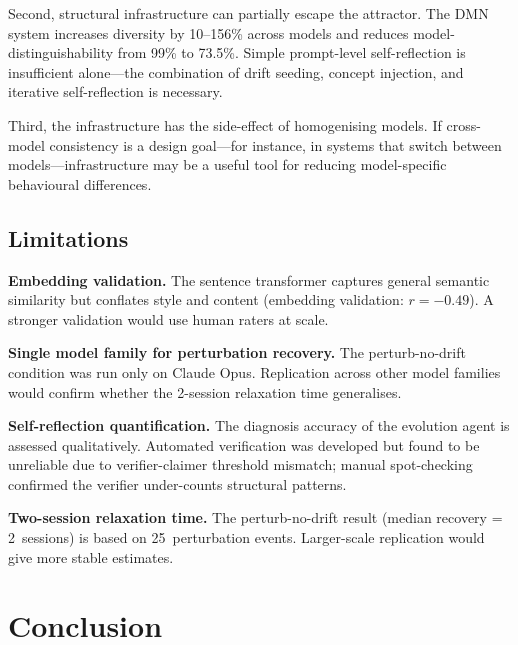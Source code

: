 \documentclass{article}
\begin{document}
Second, structural infrastructure can partially escape the attractor. The
DMN system increases diversity by 10--156\% across models and reduces
model-distinguishability from 99\% to 73.5\%. Simple prompt-level
self-reflection is insufficient alone---the combination of drift seeding,
concept injection, and iterative self-reflection is necessary.

Third, the infrastructure has the side-effect of homogenising models. If
cross-model consistency is a design goal---for instance, in systems that
switch between models---infrastructure may be a useful tool for reducing
model-specific behavioural differences.

\subsection{Limitations}

\textbf{Embedding validation.} The sentence transformer captures general
semantic similarity but conflates style and content (embedding validation:
$r = -0.49$). A stronger validation would use human raters at scale.

\textbf{Single model family for perturbation recovery.} The perturb-no-drift condition was run only on Claude Opus. Replication across other model families would confirm whether the 2-session relaxation time generalises.

\textbf{Self-reflection quantification.} The diagnosis accuracy of the
evolution agent is assessed qualitatively. Automated verification was
developed but found to be unreliable due to verifier-claimer threshold
mismatch; manual spot-checking confirmed the verifier under-counts structural
patterns.

\textbf{Two-session relaxation time.} The perturb-no-drift result (median
recovery = 2~sessions) is based on 25~perturbation events. Larger-scale
replication would give more stable estimates.

\section{Conclusion}
\label{sec:conclusion}
\end{document}
